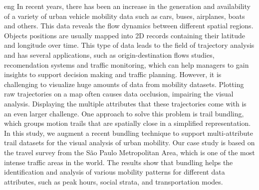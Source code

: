\begin{resumo}{eng} 
In recent years, there has been an increase in the generation and availability
of a variety of urban vehicle mobility data such as cars, buses, airplanes,
boats and others.  This data reveals the flow dynamics between different spatial
regions. Objects positions are usually mapped into 2D records containing their
latitude and longitude over time. This type of data leads to the field of
trajectory analysis and has several applications, such as origin-destination
flows studies, recomendation systems and traffic monitoring, which can help
managers to gain insights to support decision making and traffic planning.
However, it is challenging to visualize huge amounts of data from mobility
datasets. Plotting raw trajectories on a map often causes data occlusion,
impairing the visual analysis. Displaying the multiple attributes that these
trajectories come with is an even larger challenge. One approach to solve this
problem is trail bundling, which groups motion trails that are spatially close
in a simplified representation. In this study, we augment a recent bundling
technique to support multi-attribute trail datasets for the visual analysis of
urban mobility. Our case study is based on the travel survey from the São Paulo
Metropolitan Area, which is one of the most intense traffic areas in the world.
The results show that bundling helps the identification and analysis of various
mobility patterns for different data attributes, such as peak hours, social
strata, and transportation modes.
\end{resumo}
